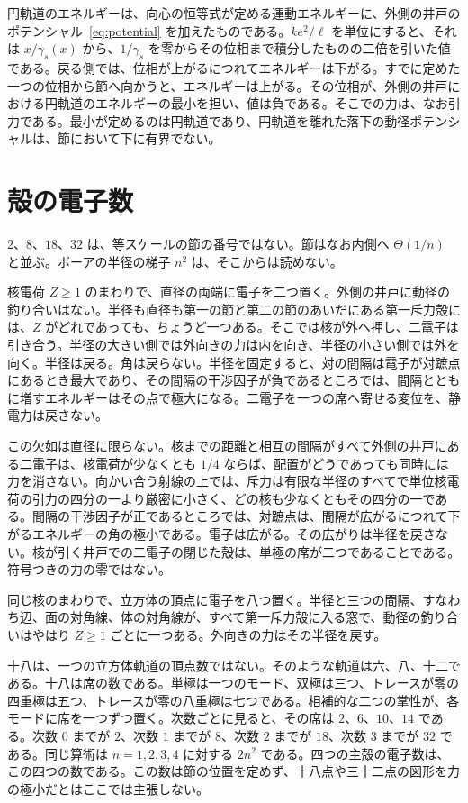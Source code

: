 \documentclass[a4paper]{article}
\begin{document}
円軌道のエネルギーは、向心の恒等式が定める運動エネルギーに、外側の井戸のポテンシャル~\eqref{eq:potential} を加えたものである。\(k e^{2}/\ell\) を単位にすると、それは \(x/\gamma_s(x)\) から、\(1/\gamma_s\) を零からその位相まで積分したものの二倍を引いた値である。戻る側では、位相が上がるにつれてエネルギーは下がる。すでに定めた一つの位相から節へ向かうと、エネルギーは上がる。その位相が、外側の井戸における円軌道のエネルギーの最小を担い、値は負である。そこでの力は、なお引力である。最小が定めるのは円軌道であり、円軌道を離れた落下の動径ポテンシャルは、節において下に有界でない。

\section{殻の電子数}
\label{sec:shells}

\(2\)、\(8\)、\(18\)、\(32\) は、等スケールの節の番号ではない。節はなお内側へ \(\Theta(1/n)\) と並ぶ。ボーアの半径の梯子 \(n^{2}\) は、そこからは読めない。

核電荷 \(Z\ge 1\) のまわりで、直径の両端に電子を二つ置く。外側の井戸に動径の釣り合いはない。半径も直径も第一の節と第二の節のあいだにある第一斥力殻には、\(Z\) がどれであっても、ちょうど一つある。そこでは核が外へ押し、二電子は引き合う。半径の大きい側では外向きの力は内を向き、半径の小さい側では外を向く。半径は戻る。角は戻らない。半径を固定すると、対の間隔は電子が対蹠点にあるとき最大であり、その間隔の干渉因子が負であるところでは、間隔とともに増すエネルギーはその点で極大になる。二電子を一つの席へ寄せる変位を、静電力は戻さない。

この欠如は直径に限らない。核までの距離と相互の間隔がすべて外側の井戸にある二電子は、核電荷が少なくとも \(1/4\) ならば、配置がどうであっても同時には力を消さない。向かい合う射線の上では、斥力は有限な半径のすべてで単位核電荷の引力の四分の一より厳密に小さく、どの核も少なくともその四分の一である。間隔の干渉因子が正であるところでは、対蹠点は、間隔が広がるにつれて下がるエネルギーの角の極小である。電子は広がる。その広がりは半径を戻さない。核が引く井戸での二電子の閉じた殻は、単極の席が二つであることである。符号つきの力の零ではない。

同じ核のまわりで、立方体の頂点に電子を八つ置く。半径と三つの間隔、すなわち辺、面の対角線、体の対角線が、すべて第一斥力殻に入る窓で、動径の釣り合いはやはり \(Z\ge 1\) ごとに一つある。外向きの力はその半径を戻す。

十八は、一つの立方体軌道の頂点数ではない。そのような軌道は六、八、十二である。十八は席の数である。単極は一つのモード、双極は三つ、トレースが零の四重極は五つ、トレースが零の八重極は七つである。相補的な二つの掌性が、各モードに席を一つずつ置く。次数ごとに見ると、その席は \(2\)、\(6\)、\(10\)、\(14\) である。次数 \(0\) までが \(2\)、次数 \(1\) までが \(8\)、次数 \(2\) までが \(18\)、次数 \(3\) までが \(32\) である。同じ算術は \(n=1,2,3,4\) に対する \(2n^{2}\) である。四つの主殻の電子数は、この四つの数である。この数は節の位置を定めず、十八点や三十二点の図形を力の極小だとはここでは主張しない。
\end{document}
